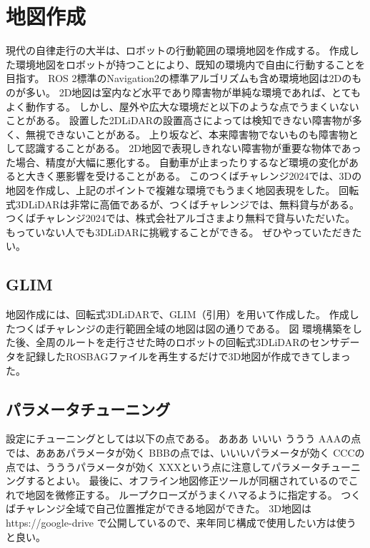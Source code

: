 \section{地図作成}
現代の自律走行の大半は、ロボットの行動範囲の環境地図を作成する。
作成した環境地図をロボットが持つことにより、既知の環境内で自由に行動することを目指す。
ROS 2標準のNavigation2の標準アルゴリズムも含め環境地図は2Dのものが多い。
2D地図は室内など水平であり障害物が単純な環境であれば、とてもよく動作する。
しかし、屋外や広大な環境だと以下のような点でうまくいないことがある。
設置した2DLiDARの設置高さによっては検知できない障害物が多く、無視できないことがある。
上り坂など、本来障害物でないものも障害物として認識することがある。
2D地図で表現しきれない障害物が重要な物体であった場合、精度が大幅に悪化する。
自動車が止まったりするなど環境の変化があると大きく悪影響を受けることがある。
このつくばチャレンジ2024では、3Dの地図を作成し、上記のポイントで複雑な環境でもうまく地図表現をした。
回転式3DLiDARは非常に高価であるが、つくばチャレンジでは、無料貸与がある。
つくばチャレンジ2024では、株式会社アルゴさまより無料で貸与いただいた。
もっていない人でも3DLiDARに挑戦することができる。
ぜひやっていただきたい。

\subsection{GLIM}
地図作成には、回転式3DLiDARで、GLIM（引用）を用いて作成した。
作成したつくばチャレンジの走行範囲全域の地図は図の通りである。
図
環境構築をした後、全周のルートを走行させた時のロボットの回転式3DLiDARのセンサデータを記録したROSBAGファイルを再生するだけで3D地図が作成できてしまった。

\subsection{パラメータチューニング}
設定にチューニングとしては以下の点である。
あああ
いいい
ううう
AAAの点では、あああパラメータが効く
BBBの点では、いいいパラメータが効く
CCCの点では、うううパラメータが効く
XXXという点に注意してパラメータチューニングするとよい。
最後に、オフライン地図修正ツールが同梱されているのでこれで地図を微修正する。
ループクローズがうまくハマるように指定する。
つくばチャレンジ全域で自己位置推定ができる地図ができた。
3D地図はhttps://google-drive で公開しているので、来年同じ構成で使用したい方は使うと良い。